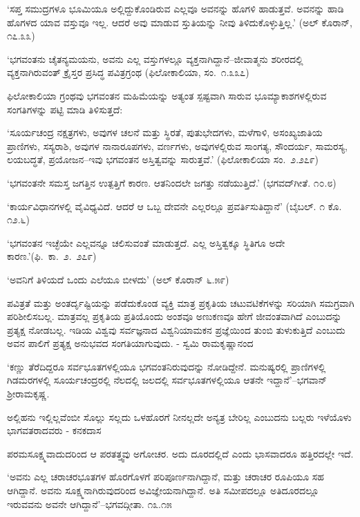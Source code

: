 ‘ಸಪ್ತ ಸಮುದ್ರಗಳೂ ಭೂಮಿಯೂ ಅಲ್ಲಿದ್ದುಕೊಂಡಿರುವ ಎಲ್ಲವೂ ಅವನನ್ನು ಹೊಗಳಿ ಹಾಡುತ್ತವೆ. ಅವನನ್ನು ಹಾಡಿ ಹೊಗಳದ ಯಾವ ವಸ್ತುವೂ ಇಲ್ಲ. ಆದರೆ ಅವು ಮಾಡುವ ಸ್ತುತಿಯನ್ನು ನೀವು ತಿಳಿದುಕೊಳ್ಳುತ್ತಿಲ್ಲ.’ (ಅಲ್ ಕೊರಾನ್, ೧೭.೩೩)

‘ಭಗವಂತನು ಚೈತನ್ಯಮಯನು, ಅವನು ಎಲ್ಲ ವಸ್ತುಗಳಲ್ಲೂ ವ್ಯಕ್ತನಾಗಿದ್ದಾನೆ–ಜೀವಾತ್ಮನು ಶರೀರದಲ್ಲಿ ವ್ಯಕ್ತನಾಗಿರುವಂತ್ ಕ್ರೈಸ್ತರ ಪ್ರಸಿದ್ಧ ಪವಿತ್ರಗ್ರಂಥ (ಫಿಲೋಕಾಲಿಯಾ, ಸಂ.\ ೧.೩೩೭)

ಫಿಲೋಕಾಲಿಯಾ ಗ್ರಂಥವು ಭಗವಂತನ ಮಹಿಮೆಯನ್ನು ಅತ್ಯಂತ ಸ್ಪಷ್ಟವಾಗಿ ಸಾರುವ ಭೂಮ್ಯಾಕಾಶಗಳಲ್ಲಿರುವ ಸಂಗತಿಗಳನ್ನು ಪಟ್ಟಿ ಮಾಡಿ ತಿಳಿಸುತ್ತದೆ:

‘ಸೂರ್ಯಚಂದ್ರ ನಕ್ಷತ್ರಗಳು, ಅವುಗಳ ಚಲನೆ ಮತ್ತು ಸ್ಥಿರತೆ, ಪುತುಭೇದಗಳು, ಮಳೆಗಾಳಿ, ಅಸಂಖ್ಯಜಾತಿಯ ಪ್ರಾಣಿಗಳು, ಸಸ್ಯರಾಶಿ, ಅವುಗಳ ನಾನಾರೂಪಗಳು, ವರ್ಣಗಳು, ಅವುಗಳಲ್ಲಿರುವ ಸಾಂಗತ್ಯ, ಸೌಂದರ್ಯ, ಸಾಮರಸ್ಯ, ಲಯಬದ್ಧತೆ, ಪ್ರಯೋಜನ–ಇವು ಭಗವಂತನ ಅಸ್ತಿತ್ವವನ್ನು ಸಾರುತ್ತವೆ.’ (ಫಿಲೋಕಾಲಿಯಾ ಸಂ.\ ೨.೨೭೯)

‘ಭಗವಂತನೇ ಸಮಸ್ತ ಜಗತ್ತಿನ ಉತ್ಪತ್ತಿಗೆ ಕಾರಣ. ಆತನಿಂದಲೇ ಜಗತ್ತು ನಡೆಯುತ್ತಿದೆ.’ (ಭಗವದ್​ಗೀತೆ. ೧೦.೮)

‘ಕಾರ್ಯವಿಧಾನಗಳಲ್ಲಿ ವೈವಿಧ್ಯವಿದೆ. ಆದರೆ ಆ ಒಬ್ಬ ದೇವನೇ ಎಲ್ಲರಲ್ಲೂ ಪ್ರವರ್ತಿಸು\-ತಿದ್ದಾನೆ’ (ಬೈಬಲ್. ೧ ಕೊ. ೧೨.೬)

‘ಭಗವಂತನ ಇಚ್ಛೆಯೇ ಎಲ್ಲವನ್ನೂ ಚಲಿಸುವಂತೆ ಮಾಡುತ್ತದೆ. ಎಲ್ಲ ಅಸ್ತಿತ್ವಕ್ಕೂ ಸ್ಥಿತಿಗೂ ಅದೇ ಕಾರಣ.'(ಫಿ.\ ಕಾ.\ ೨.\ ೨೭೯)

‘ಅವನಿಗೆ ತಿಳಿಯದೆ ಒಂದು ಎಲೆಯೂ ಬೀಳದು’ (ಅಲ್ ಕೊರಾನ್ ೬.೫೯)

ಪವಿತ್ರತೆ ಮತ್ತು ಅಂತರ್ದೃಷ್ಟಿಯನ್ನು ಪಡೆದುಕೊಂಡ ವ್ಯಕ್ತಿ ಮಾತ್ರ ಪ್ರಕೃತಿಯ ಚಟುವಟಿಕೆಗಳನ್ನು ಸರಿಯಾಗಿ ಸಮಗ್ರವಾಗಿ ಪರಿಶೀಲಿಸಬಲ್ಲ. ಮಾತ್ರವಲ್ಲ ಪ್ರಕೃತಿಯ ಪ್ರತಿಯೊಂದು ಅಂಶವೂ ಅಣುಕಣವೂ ಹೇಗೆ ಜೀವಂತವಾಗಿದೆ ಎಂಬುದನ್ನು ಪ್ರತ್ಯಕ್ಷ ನೋಡಬಲ್ಲ. ಇಡಿಯ ವಿಶ್ವವು ಸರ್ವಜ್ಞನಾದ ವಿಶ್ವನಿಯಾಮಕನ ಪ್ರಜ್ಞೆಯಿಂದ ತುಂಬಿ ತುಳುಕುತ್ತಿದೆ ಎಂಬುದು ಅವನ ಪಾಲಿಗೆ ಪ್ರತ್ಯಕ್ಷ ಅನುಭವದ ಸಂಗತಿಯಾಗುವುದು. - ಸ್ವಮಿ ರಾಮಕೃಷ್ಣಾನಂದ 

\vskip 1.2pt

‘ಕಣ್ಣು ತೆರೆದಿದ್ದರೂ ಸರ್ವಭೂತಗಳಲ್ಲಿಯೂ ಭಗವಂತನಿರುವುದನ್ನು ನೋಡಿದ್ದೇನೆ. ಮನುಷ್ಯರಲ್ಲಿ ಪ್ರಾಣಿಗಳಲ್ಲಿ ಗಿಡಮರಗಳಲ್ಲಿ ಸೂರ್ಯಚಂದ್ರರಲ್ಲಿ ನೆಲದಲ್ಲಿ ಜಲದಲ್ಲಿ ಸರ್ವ\-ಭೂತ\-\break ಗಳಲ್ಲಿಯೂ ಆತನೇ ಇದ್ದಾನೆ’–ಭಗವಾನ್ ಶ‍್ರೀರಾಮಕೃಷ್ಣ.

\vskip 1.2pt

ಅಲ್ಲಿಹನು ಇಲ್ಲಿಲ್ಲವೆಂಬೀ ಸೊಲ್ಲು ಸಲ್ಲದು ಒಳಹೊರಗೆ ನೀನಲ್ಲದೇ ಅನ್ಯತ್ರ ಬೇರಿಲ್ಲ ಎಂಬುದನು ಬಲ್ಲರು ಇಳೆಯೊಳು ಭಾಗವತರಾದವರು - ಕನಕದಾಸ 

\vskip 1.2pt

ಪರಮಸೂಕ್ಷ್ಮವಾದುದರಿಂದ ಆ ಪರತತ್ತ್ವವು ಅಗೋಚರ. ಅದು ದೂರದಲ್ಲಿದೆ ಎಂದು ಭಾಸವಾದರೂ ಹತ್ತಿರದಲ್ಲೇ ಇದೆ.

\vskip 1.2pt

‘ಅವನು ಎಲ್ಲ ಚರಾಚರಭೂತಗಳ ಹೊರಗೊಳಗೆ ಪರಿಪೂರ್ಣನಾಗಿದ್ದಾನೆ, ಮತ್ತು ಚರಾಚರ ರೂಪಿಯೂ ಸಹ ಆಗಿದ್ದಾನೆ. ಅವನು ಸೂಕ್ಷ್ಮನಾಗಿರುವುದರಿಂದ ಅವಿಜ್ಞೇಯನಾಗಿದ್ದಾನೆ. ಅತಿ ಸಮೀಪದಲ್ಲೂ ಅತಿದೂರದಲ್ಲೂ ಇರುವವನು ಅವನೇ ಆಗಿದ್ದಾನೆ’–ಭಗವದ್ಗೀತಾ. ೧೩.೧೫

